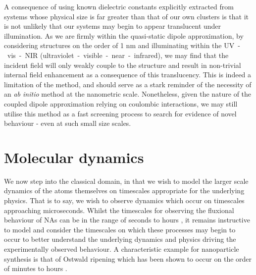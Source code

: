A consequence of using known dielectric constants explicitly extracted from systems whose physical size is far greater than that of our own clusters is that it is not unlikely that our systems may begin to appear translucent under illumination. As we are firmly within the quasi-static dipole approximation, by considering structures on the order of 1 nm and illuminating within the UV~-~vis~-~NIR (ultraviolet~-~visible~-~near~-~infrared), we may find that the incident field will only weakly couple to the structure and result in non-trivial internal field enhancement as a consequence of this translucency. This is indeed a limitation of the method, and should serve as a stark reminder of the necessity of an \textit{ab initio} method at the nanometric scale. Nonetheless, given the nature of the coupled dipole approximation relying on coulombic interactions, we may still utilise this method as a fast screening process to search for evidence of novel behaviour - even at such small size scales.


\section{Molecular dynamics}
\label{sec:CMD}
We now step into the classical domain, in that we wish to model the larger scale dynamics of the atoms themselves on timescales appropriate for the underlying physics. That is to say, we wish to observe dynamics which occur on timescales approaching microseconds. Whilst the timescales for observing the fluxional behaviour of NAs can be in the range of seconds to hours \cite{https://doi.org/10.1002/smll.201001138,https://doi.org/10.1002/smll.200801169}, it remains instructive to model and consider the timescales on which these processes may begin to occur to better understand the underlying dynamics and physics driving the experimentally observed behaviour. A characteristic example for nanoparticle synthesis is that of Ostwald ripening which has been shown to occur on the order of minutes to hours \cite{doi:10.1021/acs.langmuir.6b02662}.

